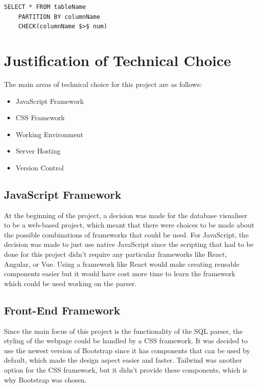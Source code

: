 \begin{lstlisting}[style=JavaScript, caption={}]
	SELECT * FROM tableName
	PARTITION BY columnName
	CHECK(columnName $>$ num)
\end{lstlisting}

\newpage

\section{Justification of Technical Choice}

The main areas of technical choice for this project are as follows:

\begin{itemize}
	\item JavaScript Framework
	\item CSS Framework
	\item Working Environment
	\item Server Hosting
	\item Version Control
\end{itemize}

\subsection{JavaScript Framework}

At the beginning of the project, a decision was made for the database visualiser to be a web-based project, which meant that there were choices to be made about the possible combinations of frameworks that could be used. For JavaScript, the decision was made to just use native JavaScript since the scripting that had to be done for this project didn't require any particular frameworks like React, Angular, or Vue. Using a framework like React would make creating reusable components easier but it would have cost more time to learn the framework which could be used working on the parser. 

\subsection{Front-End Framework}

Since the main focus of this project is the functionality of the SQL parser, the styling of the webpage could be handled by a CSS framework. It was decided to use the newest version of Bootstrap \cite{Bootstrap} since it has components that can be used by default, which made the design aspect easier and faster. Tailwind was another option for the CSS framework, but it didn't provide these components, which is why Bootstrap was chosen.

